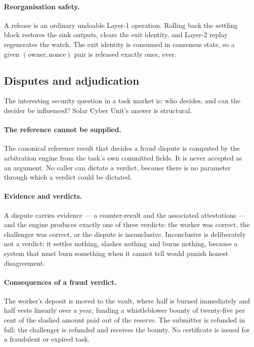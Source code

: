 \documentclass{article}
\begin{document}
\paragraph{Reorganisation safety.} A release is an ordinary undoable Layer-1
operation. Rolling back the settling block restores the sink outputs, clears
the exit identity, and Layer-2 replay regenerates the watch. The exit identity
is consumed in consensus state, so a given $(\text{owner}, \text{nonce})$ pair
is released exactly once, ever.

\subsection{Disputes and adjudication}
\label{sec:disputes}

The interesting security question in a task market is: who decides, and can the
decider be influenced? Solar Cyber Unit's answer is structural.

\paragraph{The reference cannot be supplied.} The canonical reference result
that decides a fraud dispute is computed by the arbitration engine from the
task's own committed fields. It is never accepted as an argument. No caller can
dictate a verdict, because there is no parameter through which a verdict could
be dictated.

\paragraph{Evidence and verdicts.} A dispute carries evidence --- a
counter-result and the associated attestations --- and the engine produces
exactly one of three verdicts: the worker was correct, the challenger was
correct, or the dispute is inconclusive. Inconclusive is deliberately not a
verdict: it settles nothing, slashes nothing and burns nothing, because a
system that must burn something when it cannot tell would punish honest
disagreement.

\paragraph{Consequences of a fraud verdict.} The worker's deposit is moved to
the vault, where half is burned immediately and half vests linearly over a
year, funding a whistleblower bounty of twenty-five per cent of the slashed
amount paid out of the reserve. The submitter is refunded in full; the
challenger is refunded and receives the bounty. No certificate is issued for a
fraudulent or expired task.
\end{document}
